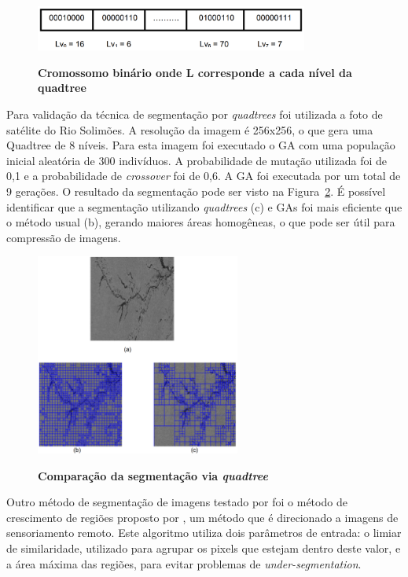 \documentclass[12pt,oneside,a4paper,english,french,spanish,brazil,]{abntex2}
\begin{document}
\begin{figure}[ht]
\centering
\caption{\textbf{Cromossomo binário onde L corresponde a cada nível da quadtree}}
\includegraphics[width=0.8\textwidth]{imagens/TrCo_Matias_Cromossomo_1.PNG}
\label{fig:TrCo_Matias_Cromossomo_1}
\end{figure}

Para validação da técnica de segmentação por \textit{quadtrees} foi utilizada a foto de satélite do Rio Solimões. A resolução da imagem é 256x256, o que gera uma Quadtree de 8 níveis. Para esta imagem foi executado o GA com uma população inicial aleatória de 300 indivíduos. A probabilidade de mutação utilizada foi de 0,1 e a probabilidade de \textit{crossover} foi de 0,6. A GA foi executada por um total de 9 gerações. O resultado da segmentação pode ser visto na Figura~\ref{fig:TrCo_Matias_Quadtree_1}. É possível identificar que a segmentação utilizando \textit{quadtrees} (c) e GAs foi mais eficiente que o método usual (b), gerando maiores áreas homogêneas, o que pode ser útil para compressão de imagens.

\begin{figure}[ht]
\centering
\caption{\textbf{Comparação da segmentação via \textit{quadtree}}}
\includegraphics[width=0.6\textwidth]{imagens/TrCo_Matias_Quadtree_1.PNG}
\label{fig:TrCo_Matias_Quadtree_1}
\end{figure}

Outro método de segmentação de imagens testado por \citet{matias:2007} foi o método de crescimento de regiões proposto por \citet{bins:1996}, um método que é direcionado a imagens de sensoriamento remoto. Este algoritmo utiliza dois parâmetros de entrada: o limiar de similaridade, utilizado para agrupar os pixels que estejam dentro deste valor, e a área máxima das regiões, para evitar problemas de \textit{under-segmentation}.
\end{document}
